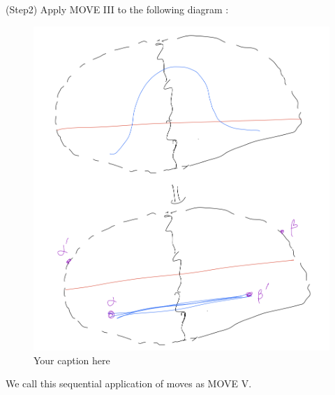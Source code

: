 (Step2) Apply MOVE \RN{3} to the following diagram :
\begin{figure}[H] %
    \centering
    \includegraphics[width=\linewidth]{diagrams/definition5/3.png} %
    \caption{Your caption here}
    \label{fig:your-label}
\end{figure}

We call this sequential application of moves as MOVE \RN{5}.